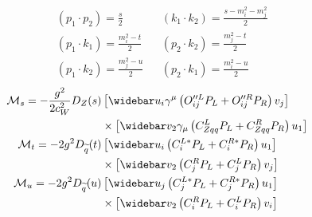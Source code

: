 \documentclass[english,notitlepage]{article}
\begin{document}
\begin{subequations}
    \begin{align}
         & (p_1 \cdot p_2) = \frac{s}{2}         &  & (k_1 \cdot k_2) = \frac{s-m_i^2-m_j^2}{2} \\
         & (p_1 \cdot k_1) = \frac{m_i^2 - t}{2} &  & (p_2 \cdot k_2) = \frac{m_j^2-t}{2}       \\
         & (p_1 \cdot k_2) = \frac{m_j^2 - u}{2} &  & (p_2 \cdot k_1) = \frac{m_i^2-u}{2}
    \end{align}
\end{subequations}
\begin{subequations}
    \begin{align} \nonumber
        \M_s = -\frac{g^2}{2c_W^2} D_Z(s) & \bclosed{ \wbar{u}_i\gamma^\mu\pclosed{O^{\prime\prime L}_{ij}P_L + O^{\prime\prime R}_{ij}P_R} v_j } \\
                                          & \times \bclosed{ \wbar{v}_2 \gamma_\mu \pclosed{C^L_{Zqq}P_L + C^R_{Zqq}P_R} u_1 }                    \\ \nonumber
        \M_t = -2g^2 D_{\wtilde{q}}(t)    & \bclosed{ \wbar{u}_i \pclosed{C_{i}^{L*}P_L + C_{i}^{R*} P_R} u_1 }                                   \\
                                          & \times \bclosed{ \wbar{v}_2 \pclosed{C^R_{j}P_L + C^L_{j}P_R} v_j }                                   \\ \nonumber
        \M_u = -2g^2 D_{\wtilde{q}}(u)    & \bclosed{ \wbar{u}_j \pclosed{C_{j}^{L*}P_L + C_{j}^{R*} P_R} u_1 }                                   \\
                                          & \times \bclosed{ \wbar{v}_2 \pclosed{C^R_{i}P_L + C^L_{i}P_R} v_i }
    \end{align}
\end{subequations}
\end{document}
